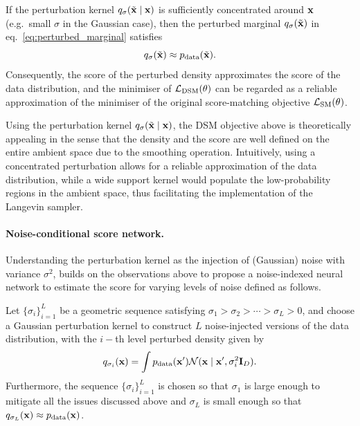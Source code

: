 \begin{remark}
If the perturbation kernel $q_\sigma(\tilde{{ \mathbf{x}}}\mid{ \mathbf{x}})$ is sufficiently concentrated around ${ \mathbf{x}}$ (e.g.\ small $\sigma$ in the Gaussian case), then the perturbed marginal
$q_\sigma(\tilde{{ \mathbf{x}}})$ in eq.~\eqref{eq:perturbed_marginal} satisfies
\[
q_\sigma(\tilde{{ \mathbf{x}}}) \approx p_{\mathrm{data}}(\tilde{{ \mathbf{x}}}).
\]
Consequently, the score of the perturbed density approximates the score of the data distribution, and the minimiser of ${\mathcal L}_{\mathrm{DSM}}(\theta)$ can be regarded as a reliable approximation of the minimiser of the original score-matching objective ${\mathcal L}_{\mathrm{SM}}(\theta)$.
\end{remark}

Using the perturbation kernel $q_\sigma(\tilde{{ \mathbf{x}}}\mid{ \mathbf{x}})$, the DSM objective above is theoretically appealing in the sense that the density and the score are well defined on the entire ambient space due to the smoothing operation. Intuitively, using a concentrated perturbation allows for a reliable approximation of the data distribution, while a wide support kernel would populate the low-probability regions in the ambient space, thus facilitating the implementation of the Langevin sampler. 

\paragraph{Noise-conditional score network.} 

Understanding the perturbation kernel as the injection of (Gaussian) noise with variance $\sigma^2$, \cite{song2021scorebased} builds on the observations above to propose a noise-indexed neural network to estimate the score for varying levels of noise defined as follows. 

Let $\{\sigma_i\}_{i=1}^L$ be a geometric sequence satisfying $\sigma_1 > \sigma_2 > \cdots > \sigma_L>0$, and choose a Gaussian perturbation kernel to construct $L$ noise-injected versions of the data distribution, with the $i-$th level perturbed density given by 
\begin{equation}
    q_{\sigma_i} ({ \mathbf{x}})= \int p_{\mathrm{data}}({ \mathbf{x}}') {\mathcal N}({ \mathbf{x}} \mid { \mathbf{x}}',\sigma_i^2 {\mathbf I}_D).
\end{equation}
Furthermore, the sequence $\{\sigma_i\}_{i=1}^L$ is chosen so that $\sigma_1$ is large enough to mitigate all the issues discussed above and $\sigma_L$ is small enough so that $q_{\sigma_L} ({ \mathbf{x}}) \approx p_{\mathrm{data}}({ \mathbf{x}})$.

